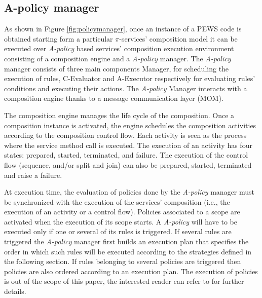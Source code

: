 \subsection{A-policy manager}

As  shown in Figure \ref{fig:policymanager}, once an instance of a PEWS code is obtained starting form a particular $\pi$-services' composition model it can be executed over {\em A-policy} based services' composition execution environment  consisting of a composition engine and a {\em A-policy} manager.  The  {\em A-policy} manager  consists of three main components Manager, for scheduling the execution of rules, C-Evaluator and A-Executor respectively for evaluating rules' conditions and executing their actions. The {\em A-policy} Manager interacts with a composition engine thanks to a  message communication layer (MOM).


The composition engine manages the life cycle of the composition. Once a composition instance is activated, the engine schedules the composition activities according to the composition control flow.
Each activity is seen as the process where the service method call is executed.
The execution of an activity has four states: prepared, started, terminated, and failure.
The execution of the control flow (sequence, and/or split and join) can also be prepared, started, terminated and raise a failure.

At execution time, the evaluation of policies done by the {\em A-policy} manager must be synchronized with the execution of the services' composition (i.e., the execution of an activity or a control flow).  Policies associated to a scope are activated when the execution of its scope starts. A {\em A-policy} will have to be executed only if one or several of its rules is triggered. If several rules are triggered the {\em A-policy} manager first builds an execution plan that specifies the order in which such rules will be executed according to the strategies defined in the following section. 
If rules belonging to several policies are triggered then policies are also ordered according to an execution plan. The execution of policies is out of the scope of this paper, the interested reader can refer to \cite{Espinosa-Oviedo2011a} for further details.



